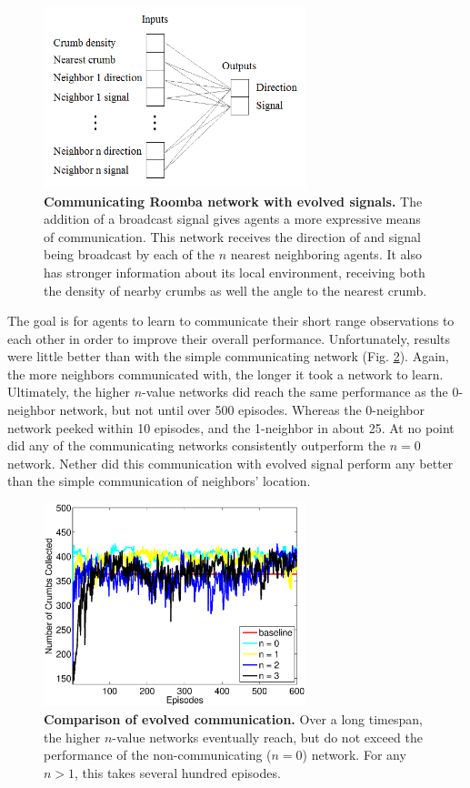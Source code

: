 \documentclass[conference]{IEEEtran}
\begin{document}
\begin{figure}[t]
\centering
\includegraphics[width=3.0in]{./figures/neroevolution/emerg_comm_network.png}
\caption{\textbf{Communicating Roomba network with evolved signals.} The addition of a broadcast signal gives agents a more expressive means of communication. This network receives the direction of and signal being broadcast by each of the $n$ nearest neighboring agents. It also has stronger information about its local environment, receiving both the density of nearby crumbs as well the angle to the nearest crumb.  }
\label{neroevolution:evolved_comunication}
\end{figure}

The goal is for agents to learn to communicate their short range observations to each other in order to improve their overall performance.
Unfortunately, results were little better than with the simple communicating network (Fig. \ref{neroevolution:evolved_comunication_results}). 
Again, the more neighbors communicated with, the longer it took a network to learn. Ultimately, the higher $n$-value networks did reach the same performance as the 0-neighbor network, but not until over 500 episodes. Whereas the 0-neighbor network peeked within 10 episodes, and the 1-neighbor in about 25. At no point did any of the communicating networks consistently outperform the $n=0$ network. Nether did this communication with evolved signal perform any better than the simple communication of neighbors' location. 

\begin{figure}[t]
\centering
\includegraphics[width=3.0in]{./figures/neroevolution/emerg.eps}
\caption{\textbf{Comparison of evolved communication.} Over a long timespan, the higher $n$-value networks eventually reach, but do not exceed the performance of the non-communicating ($n=0$) network. For any $n>1$, this takes several hundred episodes. }
\label{neroevolution:evolved_comunication_results}
\end{figure}
\end{document}
